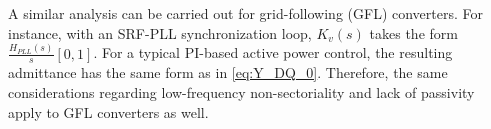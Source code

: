 \begin{rem}
    A similar analysis can be carried out for grid-following (GFL) converters. For instance, with an SRF-PLL synchronization loop, 
    $K_v(s)$ takes the form $\frac{H_{PLL}(s)}{s}[0,1]$.
    For a typical PI-based active power control, the resulting admittance has the same form as in \eqref{eq:Y_DQ_0}. 
    Therefore, the same considerations regarding low-frequency non-sectoriality and lack of passivity apply to GFL converters as well.
\end{rem}